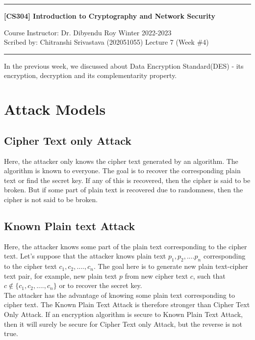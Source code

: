 \documentclass[11pt]{article}
\begin{document}
\noindent
\rule{\textwidth}{1pt}
\begin{center}
{\bf [CS304] Introduction to Cryptography and Network Security}
\end{center}
Course Instructor: Dr. Dibyendu Roy \hfill Winter 2022-2023\\
Scribed by: Chitranshi Srivastava (202051055) \hfill Lecture 7 (Week \#4)
\\
\rule{\textwidth}{1pt}
In the previous week, we discussed about Data Encryption Standard(DES) - its encryption, decryption and its complementarity property.

\section{Attack Models}
\subsection{Cipher Text only Attack}
Here, the attacker only knows the cipher text generated by an algorithm. The algorithm is known to everyone. The goal is to recover the corresponding plain text or find the secret key. If any of this is recovered, then the cipher is said to be broken. But if some part of plain text is recovered due to randomness, then the cipher is not said to be broken.

\subsection{Known Plain text Attack}
Here, the attacker knows some part of the plain text corresponding to the cipher text. Let's suppose that the attacker knows plain text $p_1, p_2,....p_n$ corresponding to the cipher text $c_1, c_2,...., c_n$. The goal here is to generate new plain text-cipher text pair, for example, new plain text $p$ from new cipher text $c$, such that $c \notin \{c_1, c_2,...., c_n\}$ or to recover the secret key.\\
\vspace{3mm}
The attacker has the advantage of knowing some plain text corresponding to cipher text. The Known Plain Text Attack is therefore stronger than Cipher Text Only Attack. If an encryption algorithm is secure to Known Plain Text Attack, then it will surely be secure for Cipher Text only Attack, but the reverse is not true.
\end{document}
